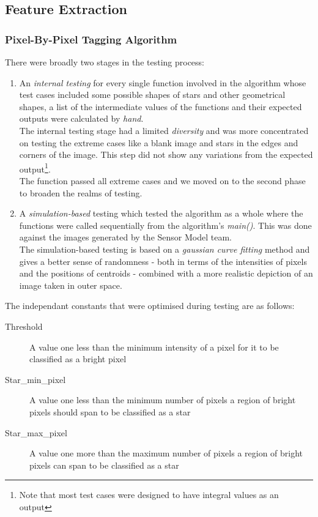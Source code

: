 \documentclass[../../main.tex]{subfiles}
\begin{document}
\subsection{Feature Extraction}
\subsubsection{Pixel-By-Pixel Tagging Algorithm}
\label{sec:pixel_by_pixel}
		There were broadly two stages in the testing process:
		\begin{enumerate}
			\item An \emph{internal testing} for every single function involved in the algorithm whose test cases included some possible shapes of stars and other geometrical shapes, a list of the intermediate values of the functions and their expected outputs were calculated by \textit{hand}. \\
			The internal testing stage had a limited \textit{diversity} and was more concentrated on testing the extreme cases like a blank image and stars in the edges and corners of the image. This step did not show any variations from the expected output\footnote{Note that most test cases were designed to have integral values as an output}. \\
			The function passed all extreme cases and we moved on to the second phase to broaden the realms of testing.
			\item A \emph{simulation-based} testing which tested the algorithm as a whole where the functions were called sequentially from the algorithm's \textit{main()}. This was done against the images generated by the Sensor Model team. \\
			The simulation-based testing is based on a \textit{gaussian curve fitting} method and gives a better sense of randomness - both in terms of the intensities of pixels and the positions of centroids - combined with a more realistic depiction of an image taken in outer space. 
		\end{enumerate}

		The independant constants that were optimised during testing are as follows:
		\begin{description}
			\item [Threshold] A value one less than the minimum intensity of a pixel for it to be classified as a bright pixel
			\item [Star\_min\_pixel] A value one less than the minimum number of pixels a region of bright pixels should span to be classified as a star
			\item [Star\_max\_pixel] A value one more than the maximum number of pixels a region of bright pixels can span to be classified as a star
		\end{description}
\end{document}
